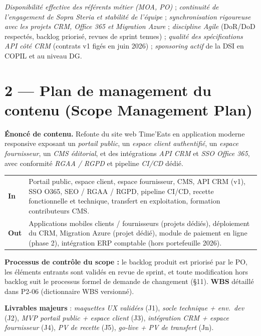 \documentclass[11pt,a4paper,oneside]{report}
\begin{document}
\textit{Disponibilité effective des référents métier (MOA, PO)} ;
\textit{continuité de l'engagement de Sopra Steria et stabilité de l'équipe} ;
\textit{synchronisation rigoureuse avec les projets CRM, Office 365 et Migration Azure} ;
\textit{discipline Agile} (DoR/DoD respectés, backlog priorisé, revues de sprint tenues) ;
\textit{qualité des spécifications API côté CRM} (contrats v1 figés en juin 2026) ;
\textit{sponsoring actif} de la DSI en COPIL et au niveau DG.

\section*{2 — Plan de management du contenu (Scope Management Plan)}

\textbf{Énoncé de contenu.} Refonte du site web Time'Eats en application moderne responsive
exposant un \textit{portail public}, un \textit{espace client authentifié}, un \textit{espace
fournisseur}, un \textit{CMS éditorial}, et des intégrations \textit{API CRM} et \textit{SSO
Office 365}, avec conformité \textit{RGAA / RGPD} et pipeline \textit{CI/CD} dédié.

\renewcommand{\arraystretch}{1.3}
\begin{tabularx}{\textwidth}{L{1.5cm} Y}
\toprule
{}\th{} & \th{} \\
\midrule
{}\textbf{In}  & Portail public, espace client, espace fournisseur, CMS,
API CRM (v1), SSO O365, SEO / RGAA / RGPD, pipeline CI/CD, recette fonctionnelle et technique,
transfert en exploitation, formation contributeurs CMS. \\
\textbf{Out} & Applications mobiles clients / fournisseurs (projets
dédiés), déploiement du CRM, Migration Azure (projet dédié), module de paiement en ligne
(phase 2), intégration ERP comptable (hors portefeuille 2026). \\
\bottomrule
\end{tabularx}

\textbf{Processus de contrôle du scope :} le backlog produit est priorisé par le PO, les
éléments entrants sont validés en revue de sprint, et toute modification hors backlog suit
le processus formel de demande de changement (§11). \textbf{WBS} détaillé dans P2-06
(dictionnaire WBS versionné).

\textbf{Livrables majeurs} : \textit{maquettes UX validées} (J1), \textit{socle technique +
env.\ dev} (J2), \textit{MVP portail public + espace client} (J3), \textit{intégration CRM +
espace fournisseur} (J4), \textit{PV de recette} (J5), \textit{go-live + PV de transfert}
(Jn).
\end{document}
